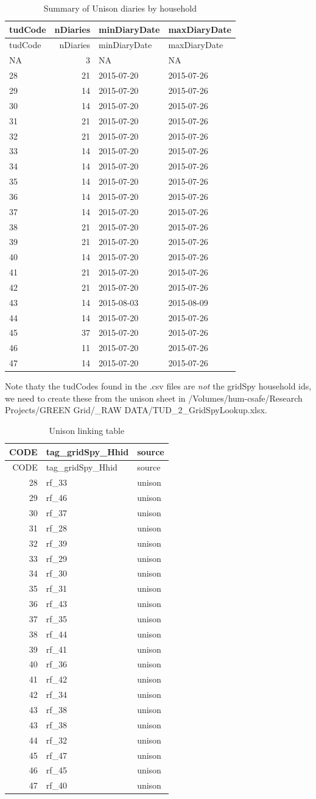 \documentclass[]{article}
\begin{document}
\begin{longtable}[]{@{}lrll@{}}
\caption{Summary of Unison diaries by household}\tabularnewline
\toprule
tudCode & nDiaries & minDiaryDate & maxDiaryDate\tabularnewline
\midrule
\endfirsthead
\toprule
tudCode & nDiaries & minDiaryDate & maxDiaryDate\tabularnewline
\midrule
\endhead
NA & 3 & NA & NA\tabularnewline
28 & 21 & 2015-07-20 & 2015-07-26\tabularnewline
29 & 14 & 2015-07-20 & 2015-07-26\tabularnewline
30 & 14 & 2015-07-20 & 2015-07-26\tabularnewline
31 & 21 & 2015-07-20 & 2015-07-26\tabularnewline
32 & 21 & 2015-07-20 & 2015-07-26\tabularnewline
33 & 14 & 2015-07-20 & 2015-07-26\tabularnewline
34 & 14 & 2015-07-20 & 2015-07-26\tabularnewline
35 & 14 & 2015-07-20 & 2015-07-26\tabularnewline
36 & 14 & 2015-07-20 & 2015-07-26\tabularnewline
37 & 14 & 2015-07-20 & 2015-07-26\tabularnewline
38 & 21 & 2015-07-20 & 2015-07-26\tabularnewline
39 & 21 & 2015-07-20 & 2015-07-26\tabularnewline
40 & 14 & 2015-07-20 & 2015-07-26\tabularnewline
41 & 21 & 2015-07-20 & 2015-07-26\tabularnewline
42 & 21 & 2015-07-20 & 2015-07-26\tabularnewline
43 & 14 & 2015-08-03 & 2015-08-09\tabularnewline
44 & 14 & 2015-07-20 & 2015-07-26\tabularnewline
45 & 37 & 2015-07-20 & 2015-07-26\tabularnewline
46 & 11 & 2015-07-20 & 2015-07-26\tabularnewline
47 & 14 & 2015-07-20 & 2015-07-26\tabularnewline
\bottomrule
\end{longtable}

Note thaty the tudCodes found in the .csv files are \emph{not} the
gridSpy household ids, we need to create these from the unison sheet in
/Volumes/hum-csafe/Research Projects/GREEN Grid/\_RAW
DATA/TUD\_2\_GridSpyLookup.xlsx.

\begin{longtable}[]{@{}rll@{}}
\caption{Unison linking table}\tabularnewline
\toprule
CODE & tag\_gridSpy\_Hhid & source\tabularnewline
\midrule
\endfirsthead
\toprule
CODE & tag\_gridSpy\_Hhid & source\tabularnewline
\midrule
\endhead
28 & rf\_33 & unison\tabularnewline
29 & rf\_46 & unison\tabularnewline
30 & rf\_37 & unison\tabularnewline
31 & rf\_28 & unison\tabularnewline
32 & rf\_39 & unison\tabularnewline
33 & rf\_29 & unison\tabularnewline
34 & rf\_30 & unison\tabularnewline
35 & rf\_31 & unison\tabularnewline
36 & rf\_43 & unison\tabularnewline
37 & rf\_35 & unison\tabularnewline
38 & rf\_44 & unison\tabularnewline
39 & rf\_41 & unison\tabularnewline
40 & rf\_36 & unison\tabularnewline
41 & rf\_42 & unison\tabularnewline
42 & rf\_34 & unison\tabularnewline
43 & rf\_38 & unison\tabularnewline
43 & rf\_38 & unison\tabularnewline
44 & rf\_32 & unison\tabularnewline
45 & rf\_47 & unison\tabularnewline
46 & rf\_45 & unison\tabularnewline
47 & rf\_40 & unison\tabularnewline
\bottomrule
\end{longtable}
\end{document}
